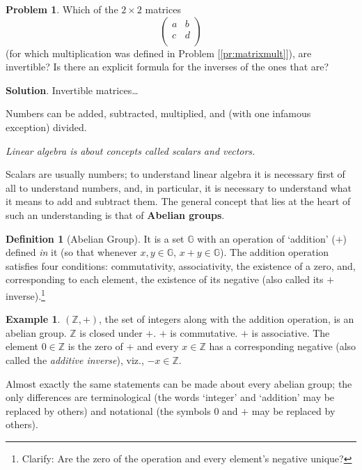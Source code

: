 \documentclass[english,notitlepage,smartquotes]{hgbreport}
\theoremstyle{definition}
\newtheorem{definition}{Definition}
\theoremstyle{definition}
\newtheorem{problem}{Problem}
\theoremstyle{remark}
\theoremstyle{definition}
\newtheorem{example}{Example}
\theoremstyle{plain}
\theoremstyle{definition}
\begin{document}
\begin{problem}
\label{pr:matrixinv}
Which of the $2\times2$ matrices 
$$
  \begin{pmatrix}
    a & b\\
    c & d\\
  \end{pmatrix}
$$
(for which multiplication was defined in Problem [\ref{pr:matrixmult}]), are invertible? Is there an explicit formula for the inverses of the ones that are?
\end{problem}

\textbf{Solution}.
Invertible matrices\dots{}

Numbers can be added, subtracted, multiplied, and (with one infamous exception) divided. 

\emph{Linear algebra is about concepts called scalars and vectors.}

Scalars are usually numbers; to understand linear algebra it is necessary first of all to understand numbers, and, in particular, it is necessary to understand what it means to add and subtract them. The general concept that lies at the heart of such an understanding is that of \textbf{Abelian groups}.

\begin{definition}[Abelian Group]
It is a set $\mathbb{G}$ with an operation of `addition' ($+$) defined \emph{in} it (so that whenever $x,y\in\mathbb{G}$, $x+y\in\mathbb{G}$). The addition operation satisfies four conditions: commutativity, associativity, the existence of a zero, and, corresponding to each element, the existence of its negative (also called its $+$ inverse).\footnote{Clarify: Are the zero of the operation and every element's negative unique?}
\end{definition}



\begin{example}
$(\mathbb{Z},+)$, the set of integers along with the addition operation, is an abelian group. $\mathbb{Z}$ is closed under $+$. $+$ is commutative. $+$ is associative. The element $0\in\mathbb{Z}$ is the zero of $+$ and every $x\in\mathbb{Z}$ has a corresponding negative (also called the \emph{additive inverse}), viz., $-x\in\mathbb{Z}$.
\end{example}

Almost exactly the same statements can be made about every abelian group; the only differences are terminological (the words `integer' and `addition' may be replaced by others) and notational (the symbols $0$ and $+$ may be replaced by others).
\end{document}
